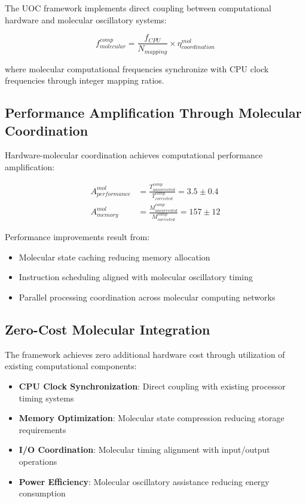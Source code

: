 \documentclass[12pt,a4paper]{article}
\begin{document}
The UOC framework implements direct coupling between computational hardware and molecular oscillatory systems:

\begin{equation}
f_{molecular}^{comp} = \frac{f_{CPU}}{N_{mapping}} \times \eta_{coordination}^{mol}
\end{equation}

where molecular computational frequencies synchronize with CPU clock frequencies through integer mapping ratios.

\subsection{Performance Amplification Through Molecular Coordination}

Hardware-molecular coordination achieves computational performance amplification:

\begin{align}
A_{performance}^{mol} &= \frac{T_{uncorrected}^{comp}}{T_{corrected}^{comp}} = 3.5 \pm 0.4 \\
A_{memory}^{mol} &= \frac{M_{uncorrected}^{comp}}{M_{corrected}^{comp}} = 157 \pm 12
\end{align}

Performance improvements result from:
\begin{itemize}
\item Molecular state caching reducing memory allocation
\item Instruction scheduling aligned with molecular oscillatory timing
\item Parallel processing coordination across molecular computing networks
\end{itemize}

\subsection{Zero-Cost Molecular Integration}

The framework achieves zero additional hardware cost through utilization of existing computational components:

\begin{itemize}
\item \textbf{CPU Clock Synchronization}: Direct coupling with existing processor timing systems
\item \textbf{Memory Optimization}: Molecular state compression reducing storage requirements
\item \textbf{I/O Coordination}: Molecular timing alignment with input/output operations
\item \textbf{Power Efficiency}: Molecular oscillatory assistance reducing energy consumption
\end{itemize}
\end{document}
